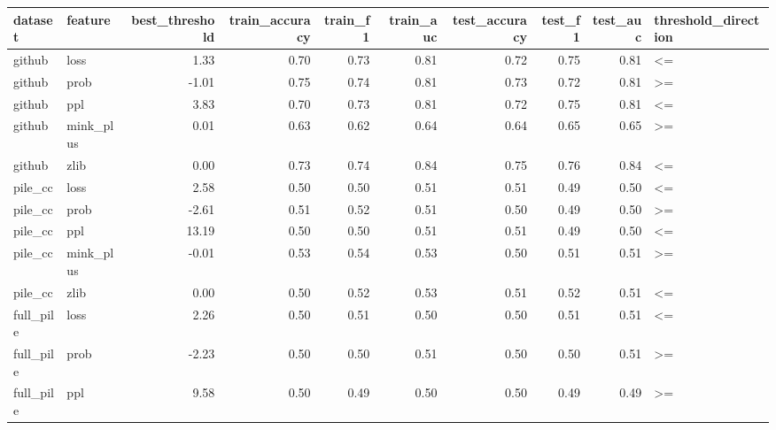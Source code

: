 \begin{tabular}{llrrrrrrrl}
\toprule
   dataset &   feature & best\_threshold & train\_accuracy & train\_f1 & train\_auc & test\_accuracy & test\_f1 & test\_auc & threshold\_direction \\
\midrule
    github &      loss &           1.33 &           0.70 &     0.73 &      0.81 &          0.72 &    0.75 &     0.81 &                  <= \\
    github &      prob &          -1.01 &           0.75 &     0.74 &      0.81 &          0.73 &    0.72 &     0.81 &                  >= \\
    github &       ppl &           3.83 &           0.70 &     0.73 &      0.81 &          0.72 &    0.75 &     0.81 &                  <= \\
    github & mink\_plus &           0.01 &           0.63 &     0.62 &      0.64 &          0.64 &    0.65 &     0.65 &                  >= \\
    github &      zlib &           0.00 &           0.73 &     0.74 &      0.84 &          0.75 &    0.76 &     0.84 &                  <= \\
   pile\_cc &      loss &           2.58 &           0.50 &     0.50 &      0.51 &          0.51 &    0.49 &     0.50 &                  <= \\
   pile\_cc &      prob &          -2.61 &           0.51 &     0.52 &      0.51 &          0.50 &    0.49 &     0.50 &                  >= \\
   pile\_cc &       ppl &          13.19 &           0.50 &     0.50 &      0.51 &          0.51 &    0.49 &     0.50 &                  <= \\
   pile\_cc & mink\_plus &          -0.01 &           0.53 &     0.54 &      0.53 &          0.50 &    0.51 &     0.51 &                  >= \\
   pile\_cc &      zlib &           0.00 &           0.50 &     0.52 &      0.53 &          0.51 &    0.52 &     0.51 &                  <= \\
 full\_pile &      loss &           2.26 &           0.50 &     0.51 &      0.50 &          0.50 &    0.51 &     0.51 &                  <= \\
 full\_pile &      prob &          -2.23 &           0.50 &     0.50 &      0.51 &          0.50 &    0.50 &     0.51 &                  >= \\
 full\_pile &       ppl &           9.58 &           0.50 &     0.49 &      0.50 &          0.50 &    0.49 &     0.49 &                  >= \\

\end{tabular}
